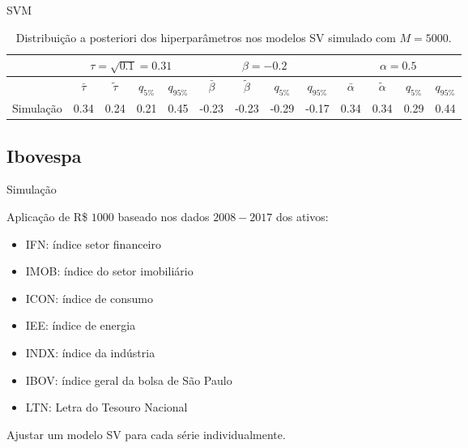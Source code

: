 \documentclass{beamer}
\begin{document}
 
 \begin{frame}{SVM}


\begin{table}[ht]
\centering
\tiny
\begin{tabular}{c|cccc|cccc|cccc}
 \hline
  \hline
 & \multicolumn{4}{c|}{$\tau=\sqrt{0.1}=0.31$} &  \multicolumn{4}{c|}{$\beta=-0.2$} &  \multicolumn{4}{c}{$\alpha=0.5$} \\
 \hline
  & $\bar{\tau}$ & $\tilde{\tau}$ & $q_{5\%}$ & $q_{95\%}$ & $\bar{\beta}$ & $\tilde{\beta}$ & $q_{5\%}$ & $q_{95\%}$ & $\bar{\alpha}$ & $\tilde{\alpha}$ & $q_{5\%}$ & $q_{95\%}$\\ 
  \hline
Simulação & 0.34 & 0.24 & 0.21 & 0.45 & -0.23 & -0.23 & -0.29 & -0.17 & 0.34 & 0.34 & 0.29 & 0.44 \\ 
   \hline
    \hline
\end{tabular}
\caption[\scriptsize{Distribuição a posteriori de $\tau$, $\beta$ e $\alpha$}]{\scriptsize{Distribuição a posteriori dos hiperparâmetros nos modelos SV simulado com $M=5000$.}}
\label{tab:hiperest1000simula}
\end{table}

\end{frame}



 
\subsection{Ibovespa}


 
 \begin{frame}{Simulação}


Aplicação de R\$ $1000$ baseado nos dados $2008-2017$ dos ativos:
\vspace{.25cm}
\begin{itemize}
\item IFN:  índice setor financeiro
\item IMOB: índice do setor imobiliário
\item ICON: índice de consumo
\item IEE:  índice de energia
\item INDX: índice da indústria
\item IBOV: índice geral da bolsa de São Paulo
\item LTN: Letra do Tesouro Nacional
\end{itemize}
\vspace{.25cm}

Ajustar um modelo SV para cada série individualmente.
\end{frame}
\end{document}
